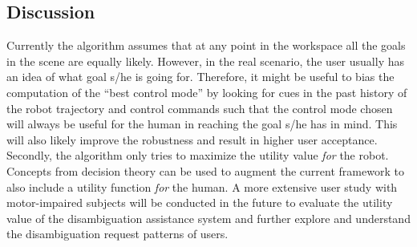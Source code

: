 \documentclass[conference]{IEEEtran}
\begin{document}
\subsection{Discussion}
Currently the algorithm assumes that at any point in the workspace all the goals in the scene are equally likely. However, in the real scenario, the user usually has an idea of what goal s/he is going for. Therefore, it might be useful to bias the computation of the ``best control mode'' by looking for cues in the past history of the robot trajectory and control commands such that the control mode chosen will always be useful for the human in reaching the goal s/he has in mind. This will also likely improve the robustness and result in higher user acceptance. 
Secondly, the algorithm only tries to maximize the utility value \textit{for} the robot. Concepts from decision theory can be used to augment the current framework to also include a utility function \textit{for} the human. A more extensive user study with motor-impaired subjects will be conducted in the future to evaluate the utility value of the disambiguation assistance system and further explore and understand the disambiguation request patterns of users. 
\end{document}
